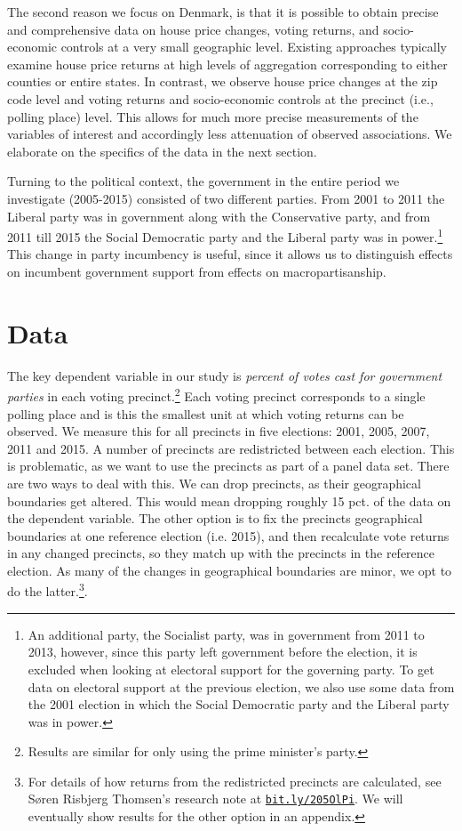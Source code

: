 \documentclass[12pt,a4paper]{article}
\begin{document}
The second reason we focus on Denmark, is that it is possible to obtain precise and comprehensive data on house price changes, voting returns, and socio-economic controls at a very small geographic level. Existing approaches typically examine house price returns at high levels of aggregation corresponding to either counties or entire states. In contrast, we observe house price changes at the zip code level and voting returns and socio-economic controls at the precinct (i.e., polling place) level. This allows for much more precise measurements of the variables of interest and accordingly less attenuation of observed associations. We elaborate on the specifics of the data in the next section.

Turning to the political context, the government in the entire period we investigate (2005-2015) consisted of two different parties. From 2001 to 2011 the Liberal party was in government along with the Conservative party, and from 2011 till 2015 the Social Democratic party and the Liberal party was in power.\footnote{An additional party, the Socialist party, was in government from 2011 to 2013, however, since this party left government before the election, it is excluded when looking at electoral support for the governing party. To get data on electoral support at the previous election, we also use some data from the 2001 election in which the Social Democratic party and the Liberal party was in power.} This change in party incumbency is useful, since it allows us to distinguish effects on incumbent government support from effects on macropartisanship. 


\section{Data}
The key dependent variable in our study is \textit{percent of votes cast for government parties} in each voting precinct.\footnote{Results are similar for only using the prime minister's party.} Each voting precinct corresponds to a single polling place and is this the smallest unit at which voting returns can be observed. We measure this for all precincts in five elections: 2001, 2005, 2007, 2011 and 2015. A number of precincts are redistricted between each election. This is problematic, as we want to use  the precincts as part of a panel data set. There are two ways to deal with this. We can drop precincts, as their geographical boundaries get altered. This would mean dropping roughly 15 pct. of the data on the dependent variable. The other option is to fix the precincts geographical boundaries at one reference election (i.e. 2015), and then recalculate vote returns in any changed precincts, so they match up with the precincts in the reference election.  As many of the changes in geographical boundaries are minor, we opt to do the latter.\footnote{For details of how returns from the redistricted precincts are calculated, see Søren Risbjerg Thomsen's research note at \texttt{\href{http://bit.ly/205OlPi}{bit.ly/205OlPi}}. We will eventually show results for the other option in an appendix.}. 
\end{document}
